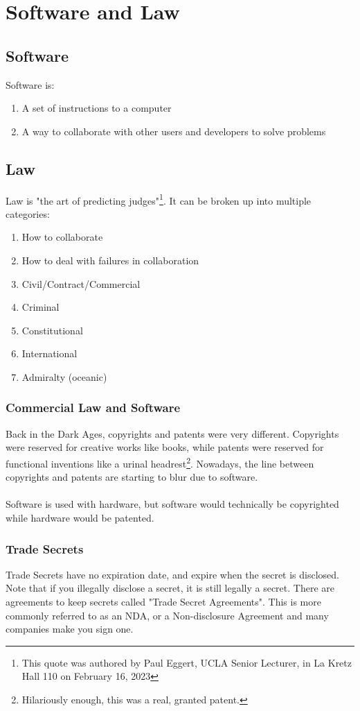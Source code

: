 \documentclass[13pt]{article}
\begin{document}
\section{Software and Law}
\subsection{Software}
Software is:
\begin{enumerate}[label=]
\item A set of instructions to a computer
\item A way to collaborate with other users and developers to solve problems
\end{enumerate}

\subsection{Law}
Law is "the art of predicting judges"\footnote{This quote was authored by Paul Eggert, UCLA Senior Lecturer, in La Kretz Hall 110 on February 16, 2023}. It can be broken up into multiple categories:
\begin{enumerate}[label=]
\item How to collaborate
\item How to deal with failures in collaboration
\item Civil/Contract/Commercial
\item Criminal
\item Constitutional
\item International
\item Admiralty (oceanic)
\end{enumerate}

\subsubsection{Commercial Law and Software}
Back in the Dark Ages, copyrights and patents were very different. Copyrights were reserved for creative works like books, while patents were reserved for functional inventions like a urinal headrest\footnote{Hilariously enough, this was a real, granted patent.}. Nowadays, the line between copyrights and patents are starting to blur due to software. \\ \\
Software is used with hardware, but software would technically be copyrighted while hardware would be patented.

\subsubsection*{Trade Secrets}
Trade Secrets have no expiration date, and expire when the secret is disclosed. Note that if you illegally disclose a secret, it is still legally a secret. There are agreements to keep secrets called "Trade Secret Agreements". This is more commonly referred to as an NDA, or a Non-disclosure Agreement and many companies make you sign one.
\end{document}
